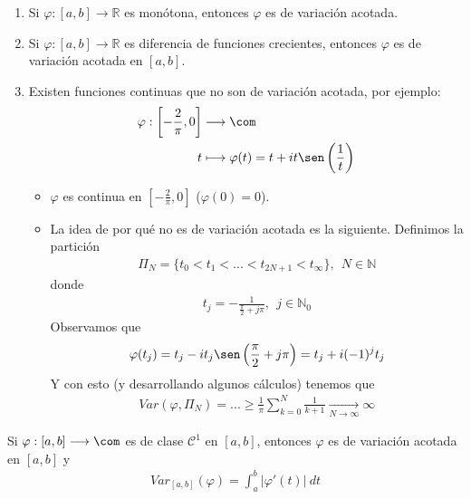 \begin{ejemplo}
\begin{enumerate}
    \item Si $\varphi : [a,b] \longrightarrow \mathbb{R}$ es monótona, entonces $\varphi$ es de variación acotada.
    \item Si $\varphi : [a,b] \longrightarrow \mathbb{R}$ es diferencia de funciones crecientes, entonces $\varphi$ es de variación acotada en $[a,b]$.
    \item Existen funciones continuas que no son de variación acotada, por ejemplo:
    \begin{align*}
        \varphi : \left[ -\frac{2}{\pi},0 \right] &\longrightarrow \com \\
        t &\longmapsto \varphi(t) = t +it\sen\left( \frac{1}{t}\right)
    \end{align*}
    \begin{itemize}
        \item $\varphi$ es continua en $\left[ -\frac{2}{\pi},0 \right]$ ($\varphi(0) = 0$).
        \item La idea de por qué no es de variación acotada es la siguiente. Definimos la partición 
        \begin{align*}
            \Pi_N = \{t_0 < t_1 < ... < t_{2N +1} < t_{\infty} \}, \ \ N \in \mathbb{N}
        \end{align*}
        donde 
        \begin{align*}
            t_j = -\frac{1}{\frac{\pi}{2} + j\pi}, \ \ j \in \mathbb{N}_{0}
        \end{align*}
        Observamos que
        \begin{align*}
            \varphi(t_j) = t_j - it_j\sen\left( \frac{\pi}{2} +j\pi \right) = t_j + i(-1)^jt_j
        \end{align*}
        Y con esto (y desarrollando algunos cálculos) tenemos que
        \begin{align*}
            Var(\varphi,\Pi_N) = ... \ge \frac{1}{\pi} \sum_{k=0}^{N}{\frac{1}{k+1}} \xrightarrow[N \to \infty]{} \infty
        \end{align*}
    \end{itemize}
\end{enumerate}
\end{ejemplo}

\begin{prop}
Si $\varphi : [a,b] \longrightarrow \com$ es de clase $\mathscr{C}^1$ en $[a,b]$, entonces $\varphi$ es de variación acotada en $[a,b]$ y
\begin{align*}
    Var_{[a,b]}(\varphi) = \int_{a}^{b}{\left|\varphi'(t)\right| \ dt}
\end{align*}
\end{prop}

